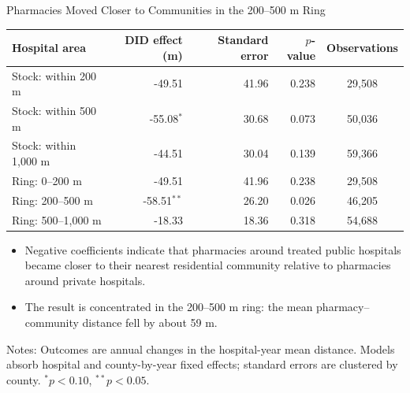 \documentclass[aspectratio=169,11pt]{beamer}
\begin{document}
\begin{frame}{Pharmacies Moved Closer to Communities in the 200--500 m Ring}
\centering
\footnotesize
\begin{tabular}{lrrrc}
\toprule
Hospital area & DID effect (m) & Standard error & $p$-value & Observations \\
\midrule
Stock: within 200 m       & -49.51 & 41.96 & 0.238 & 29,508 \\
Stock: within 500 m       & -55.08$^{*}$ & 30.68 & 0.073 & 50,036 \\
Stock: within 1,000 m     & -44.51 & 30.04 & 0.139 & 59,366 \\
\addlinespace
Ring: 0--200 m            & -49.51 & 41.96 & 0.238 & 29,508 \\
Ring: 200--500 m          & -58.51$^{**}$ & 26.20 & 0.026 & 46,205 \\
Ring: 500--1,000 m        & -18.33 & 18.36 & 0.318 & 54,688 \\
\bottomrule
\end{tabular}

\vspace{0.55em}
\begin{itemize}\setlength\itemsep{0.3em}
  \item Negative coefficients indicate that pharmacies around treated public hospitals became closer to their nearest residential community relative to pharmacies around private hospitals.
  \item The result is concentrated in the 200--500 m ring: the mean pharmacy--community distance fell by about 59 m.
\end{itemize}
\vspace{0.2em}
\raggedright\tiny Notes: Outcomes are annual changes in the hospital-year mean distance. Models absorb hospital and county-by-year fixed effects; standard errors are clustered by county. $^{*}p<0.10$, $^{**}p<0.05$.
\end{frame}
\end{document}
